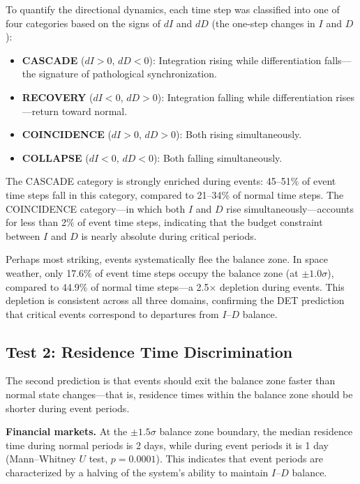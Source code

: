 \documentclass[12pt,a4paper]{article}
\begin{document}
To quantify the directional dynamics, each time step was classified into one of four categories based on the signs of $dI$ and $dD$ (the one-step changes in $I$ and $D$):

\begin{itemize}
\item \textbf{CASCADE} ($dI > 0$, $dD < 0$): Integration rising while differentiation falls---the signature of pathological synchronization.
\item \textbf{RECOVERY} ($dI < 0$, $dD > 0$): Integration falling while differentiation rises---return toward normal.
\item \textbf{COINCIDENCE} ($dI > 0$, $dD > 0$): Both rising simultaneously.
\item \textbf{COLLAPSE} ($dI < 0$, $dD < 0$): Both falling simultaneously.
\end{itemize}

The CASCADE category is strongly enriched during events: 45--51\% of event time steps fall in this category, compared to 21--34\% of normal time steps. The COINCIDENCE category---in which both $I$ and $D$ rise simultaneously---accounts for less than 2\% of event time steps, indicating that the budget constraint between $I$ and $D$ is nearly absolute during critical periods.

Perhaps most striking, events systematically flee the balance zone. In space weather, only 17.6\% of event time steps occupy the balance zone (at $\pm 1.0\sigma$), compared to 44.9\% of normal time steps---a 2.5$\times$ depletion during events. This depletion is consistent across all three domains, confirming the DET prediction that critical events correspond to departures from $I$--$D$ balance.

\subsection{Test 2: Residence Time Discrimination}

The second prediction is that events should exit the balance zone faster than normal state changes---that is, residence times within the balance zone should be shorter during event periods.

\textbf{Financial markets.} At the $\pm 1.5\sigma$ balance zone boundary, the median residence time during normal periods is 2 days, while during event periods it is 1 day (Mann--Whitney $U$ test, $p = 0.0001$). This indicates that event periods are characterized by a halving of the system's ability to maintain $I$--$D$ balance.
\end{document}
